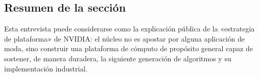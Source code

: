 \subsection{Resumen de la sección}
Esta entrevista puede considerarse como la explicación pública de la «estrategia de plataforma» de NVIDIA: el núcleo no es apostar por alguna aplicación de moda, sino construir una plataforma de cómputo de propósito general capaz de sostener, de manera duradera, la siguiente generación de algoritmos y su implementación industrial.


